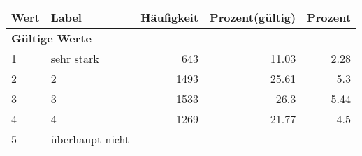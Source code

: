      \begin{longtable}{lXrrr}
     \toprule
     \textbf{Wert} & \textbf{Label} & \textbf{Häufigkeit} & \textbf{Prozent(gültig)} & \textbf{Prozent} \\
     \endhead
     \midrule
     \multicolumn{5}{l}{\textbf{Gültige Werte}}\\

     1 &
     \multicolumn{1}{X}{ sehr stark   } &


       \num{643} &
       \num[round-mode=places,round-precision=2]{11.03} &
         \num[round-mode=places,round-precision=2]{2.28} \\

     2 &
     \multicolumn{1}{X}{ 2   } &


       \num{1493} &
       \num[round-mode=places,round-precision=2]{25.61} &
         \num[round-mode=places,round-precision=2]{5.3} \\

     3 &
     \multicolumn{1}{X}{ 3   } &


       \num{1533} &
       \num[round-mode=places,round-precision=2]{26.3} &
         \num[round-mode=places,round-precision=2]{5.44} \\

     4 &
     \multicolumn{1}{X}{ 4   } &


       \num{1269} &
       \num[round-mode=places,round-precision=2]{21.77} &
         \num[round-mode=places,round-precision=2]{4.5} \\

     5 &
     \multicolumn{1}{X}{ überhaupt nicht   } &



\end{longtable}
